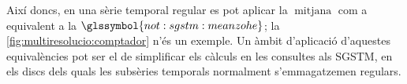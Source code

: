   Així doncs, en una sèrie temporal regular es pot aplicar la
  $\operatorname{mitjana}$ com a equivalent a la
  $\glssymbol{not:sgstm:meanzohe}$; la
  \autoref{fig:multiresolucio:comptador} n'és un exemple. Un àmbit
  d'aplicació d'aquestes equivalències pot ser el de simplificar els
  càlculs en les consultes als \gls{SGSTM}, en els discs dels quals
  les subsèries temporals normalment s'emmagatzemen regulars.
 









